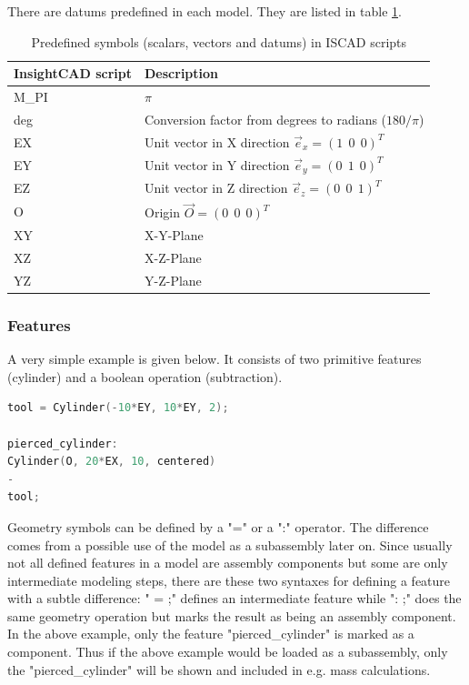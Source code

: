 There are datums predefined in each model. They are listed in table \ref{tab:iscad_datums}.

\begin{table}[h!]
\begin{tabular}{ll}
\hline
InsightCAD script & Description \\
\hline\hline
  M\_PI                   & $\pi$ \\
  deg                     & Conversion factor from degrees to radians ($180/\pi$) \\
  EX                      & Unit vector in X direction $\vec e_x = (1 ~~ 0 ~~ 0)^T$\\
  EY                      & Unit vector in Y direction $\vec e_y = (0 ~~ 1 ~~ 0)^T$\\
  EZ                      & Unit vector in Z direction $\vec e_z = (0 ~~ 0 ~~ 1)^T$\\
  O                       & Origin $\vec O = (0 ~~ 0 ~~ 0)^T$\\
  XY                      & X-Y-Plane\\
  XZ                      & X-Z-Plane\\
  YZ                      & Y-Z-Plane\\
\hline
\end{tabular}
\caption{Predefined symbols (scalars, vectors and datums) in ISCAD scripts}
\label{tab:iscad_datums}
\end{table}

\FloatBarrier

\subsubsection{Features}

A very simple example is given below. It consists of two primitive
features (cylinder) and a boolean operation (subtraction).

\begin{lstlisting}[language=c++]
tool = Cylinder(-10*EY, 10*EY, 2);

pierced_cylinder:
Cylinder(O, 20*EX, 10, centered)
-
tool;
\end{lstlisting}
    


Geometry symbols can be defined by a "=" or a ":" operator. 
The difference comes from a possible use of the model as a subassembly later
on. Since usually not all defined features in a model are assembly
components but some are only intermediate modeling steps, there are
these two syntaxes for defining a feature with a subtle difference:
" = ;" defines an intermediate feature
while ": ;" does the same geometry
operation but marks the result as being an assembly component. In the
above example, only the feature "pierced\_cylinder" is marked as a
component. Thus if the above example would be loaded as a subassembly,
only the "pierced\_cylinder" will be shown and included in e.g. mass
calculations.

